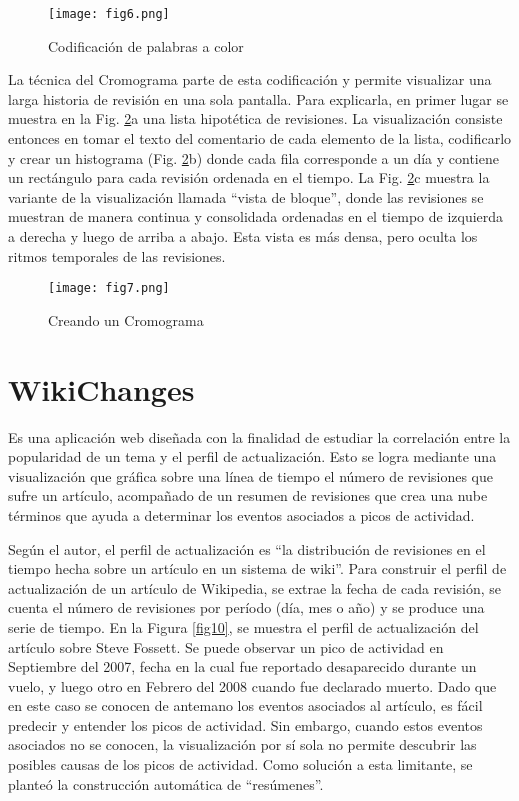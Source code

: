 \begin{figure}[ht]
  \centering
  \texttt{[image: fig6.png]}
  \caption{Codificación de palabras a color}
  \label{fig6}
\end{figure}

La técnica del Cromograma parte de esta codificación y permite visualizar una larga historia de revisión en una sola pantalla. Para explicarla, en primer lugar se muestra en la Fig. \ref{fig7}a una lista hipotética de revisiones. La visualización consiste entonces en tomar el texto del comentario de cada elemento de la lista, codificarlo y crear un histograma (Fig. \ref{fig7}b) donde cada fila corresponde a un día y contiene un rectángulo para cada revisión ordenada en el tiempo. La Fig. \ref{fig7}c muestra la variante de la visualización llamada “vista de bloque”, donde las revisiones se muestran de manera continua y consolidada ordenadas en el tiempo de izquierda a derecha y luego de arriba a abajo. Esta vista es más densa, pero oculta los ritmos temporales de las revisiones.

\begin{figure}[ht]
  \centering
  \texttt{[image: fig7.png]}
  \caption{Creando un Cromograma}
  \label{fig7}
\end{figure}

\section{WikiChanges}
Es una aplicación web diseñada con la finalidad de estudiar la correlación entre la popularidad de un tema y el perfil de actualización. Esto se logra mediante una visualización que gráfica sobre una línea de tiempo el número de revisiones que sufre un artículo, acompañado de un resumen de revisiones que crea una nube términos que ayuda a determinar los eventos asociados a picos de actividad.

Según el autor, el perfil de actualización es “la distribución de revisiones en el tiempo hecha sobre un artículo en un sistema de wiki”. Para construir el perfil de actualización de un artículo de Wikipedia, se extrae la fecha de cada revisión, se cuenta el número de revisiones por período (día, mes o año) y se produce una serie de tiempo.
En la Figura \ref{fig10}, se muestra el perfil de actualización del artículo sobre Steve Fossett. Se puede observar un pico de actividad en Septiembre del 2007, fecha en la cual fue reportado desaparecido durante un vuelo, y luego otro en Febrero del 2008 cuando fue declarado muerto. Dado que en este caso se conocen de antemano los eventos asociados al artículo, es fácil predecir y entender los picos de actividad. Sin embargo, cuando estos eventos asociados no se conocen, la visualización por sí sola no permite descubrir las posibles causas de los picos de actividad. Como solución a esta limitante, se planteó la construcción automática de “resúmenes”.

